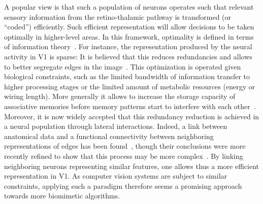 \documentclass[a4paper, 11pt]{book}
\begin{document}
A popular view is that such a population of neurons operates
such that relevant sensory information from the retino-thalamic pathway
is transformed (or ``coded'') efficiently.
Such efficient representation will allow decisions
to be taken optimally in higher-level areas.
In this framework, optimality is defined in terms of information theory~\citep{Attneave54,Atick92,Wolfe10}.
For instance, the representation produced by the neural activity in V1 is sparse:
It is believed that this reduces redundancies
and allows to better segregate edges in the image~\citep{Field94,Froudarakis14}.
This optimization is operated given biological constraints, 
such as the limited bandwidth of information transfer to higher processing stages 
or the limited amount of metabolic resources (energy or wiring length).
More generally it allows to increase the storage capacity of associative memories 
before memory patterns start to interfere with each other~\citep{Palm13}.
Moreover, it is now widely accepted that this redundancy reduction
is achieved in a neural population through lateral interactions.
Indeed, a link between anatomical data and a functional connectivity
between neighboring representations of edges has been found~\citep{Bosking97},
though their conclusions were more recently refined to show that this process may be more complex~\citep{Hunt11}.
By linking neighboring neurons representing similar features, one allows thus a more efficient representation in V1.
As computer vision systems are subject to similar constraints,
applying such a paradigm therefore seems a promising approach towards more biomimetic algorithms.
\end{document}
